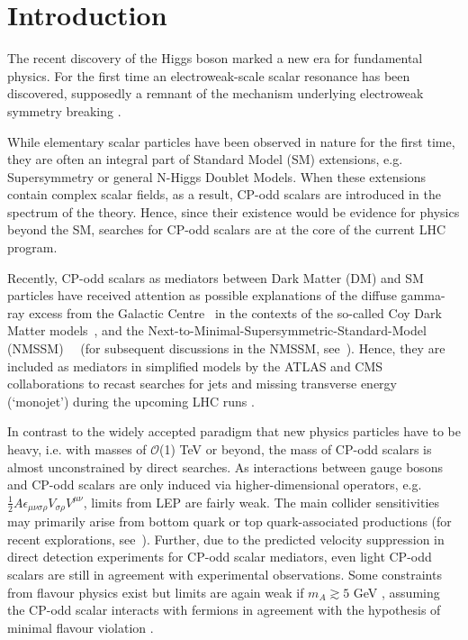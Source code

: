\documentclass[preprintnumbers,superscriptaddress,nofootinbib,aps,prd,floatfix]{revtex4}
\begin{document}
\section{Introduction}
\label{sec:intro}
The recent discovery of the Higgs boson \cite{Chatrchyan:2012ufa,Aad:2012tfa} marked a new era for fundamental physics. For the first time an electroweak-scale scalar resonance has been discovered, supposedly a remnant of the mechanism underlying electroweak symmetry breaking \cite{orig}.

While elementary scalar particles have been observed in nature for the first time, they are often an integral part of Standard Model (SM) extensions, e.g. Supersymmetry or general N-Higgs Doublet Models. When these extensions contain complex scalar fields, as a result, CP-odd scalars are introduced in the spectrum of the theory. Hence, since their existence would be evidence for physics beyond the SM, searches for CP-odd scalars are at the core of the 
current LHC program. 

Recently, CP-odd scalars as mediators between Dark Matter (DM) and SM particles have received attention as possible explanations of the diffuse gamma-ray excess from the Galactic Centre~\cite{Goodenough:2009gk,Hooper:2010mq,Abazajian:2012pn,Daylan:2014rsa} in the contexts of the so-called Coy Dark Matter models~\cite{Boehm:2014hva,Abdullah:2014lla,Hektor:2014kga,Arina:2014yna}, and the Next-to-Minimal-Supersymmetric-Standard-Model (NMSSM)~~\cite{Cheung:2014lqa,Huang:2014cla} (for subsequent discussions in the NMSSM, see~\cite{Cahill-Rowley:2014ora,Guo:2014gra,Cao:2014efa,Bi:2015qva,Butter:2015fqa}). Hence, they are included as mediators in simplified models by the ATLAS and CMS collaborations to recast searches for  jets and missing transverse energy (`monojet') during the upcoming LHC runs \cite{Malik:2014ggr,Abdallah:2014hon}.

In contrast to the widely accepted paradigm that new physics particles have to be heavy, i.e. with masses of $\mathcal{O}$(1) TeV or beyond, the mass of CP-odd scalars is almost unconstrained by direct searches. As interactions between gauge bosons and CP-odd scalars are only induced via higher-dimensional operators, e.g. $\frac{1}{2} A \epsilon_{\mu \nu \sigma \rho} V_{\sigma \rho} V^{\mu \nu}$, limits from LEP are fairly weak. The main collider sensitivities may primarily arise from bottom quark or top quark-associated productions (for recent explorations, see~\cite{Craig:2015jba,Hajer:2015gka}). Further, due to the predicted velocity suppression in direct detection experiments for CP-odd scalar mediators, even light CP-odd scalars are still in agreement with experimental observations. Some constraints from flavour physics exist but limits are again weak if $m_A \gtrsim 5$ GeV \cite{Dolan:2014ska}, assuming the CP-odd scalar interacts with fermions in agreement with the hypothesis of minimal flavour violation \cite{D'Ambrosio:2002ex}. 
\end{document}
